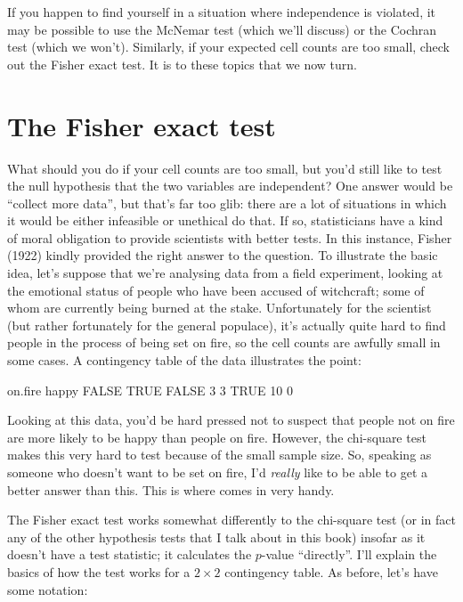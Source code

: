 \noindent
If you happen to find yourself in a situation where independence is violated, it may be possible to use the McNemar test (which we'll discuss) or the Cochran test (which we won't). Similarly, if your expected cell counts are too small, check out the Fisher exact test. It is to these topics that we now turn. 


\section{The Fisher exact test~\label{sec:fisherexacttest}}

What should you do if your cell counts are too small, but you'd still like to test the null hypothesis that the two variables are independent? One answer would be ``collect more data'', but that's far too glib: there are a lot of situations in which it would be either infeasible or unethical do that. If so, statisticians have a kind of moral obligation to provide scientists with better tests. In this instance, Fisher (1922) kindly provided the right answer to the question. To illustrate the basic idea, let's suppose that we're analysing data from a field experiment, looking at the emotional status of people who have been accused of witchcraft; some of whom are currently being burned at the stake. Unfortunately for the scientist (but rather fortunately for the general populace), it's actually quite hard to find people in the process of being set on fire, so the cell counts are awfully small in some cases. A contingency table of the  data illustrates the point:

\begin{rblock1}
       on.fire
happy   FALSE TRUE
  FALSE     3    3
  TRUE     10    0
\end{rblock1}

Looking at this data, you'd be hard pressed not to suspect that people not on fire are more likely to be happy than people on fire. However, the chi-square test makes this very hard to test because of the small sample size. So, speaking as someone who doesn't want to be set on fire, I'd {\it really} like to be able to get a better answer than this. This is where  \parencite{Fisher1922} comes in very handy. 

The Fisher exact test works somewhat differently to the chi-square test (or in fact any of the other hypothesis tests that I talk about in this book) insofar as it doesn't have a test statistic; it calculates the $p$-value ``directly''. I'll explain the basics of how the test works for a $2 \times 2$ contingency table. As before, let's have some notation: 

